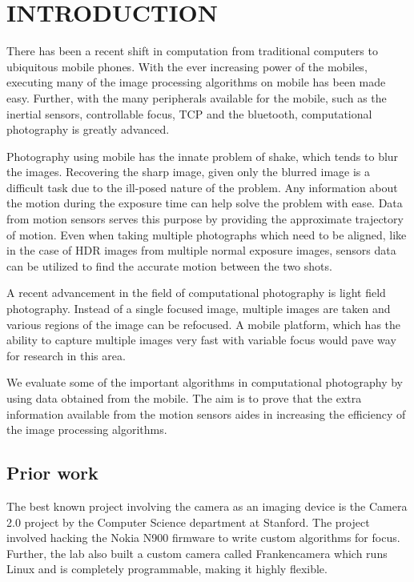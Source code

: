 \documentclass[BTech]{iitmdiss}
\begin{document}
\chapter{INTRODUCTION}
\label{chap:intro}
There has been a recent shift in computation from traditional computers
to ubiquitous mobile phones. With the ever increasing power of the mobiles, 
executing many of the image processing algorithms on mobile has been 
made easy. Further, with the many peripherals available for the mobile, such as
the inertial sensors, controllable focus, TCP and the bluetooth, 
computational photography is greatly advanced. 

Photography using mobile has the innate problem of shake, which tends to
blur the images. Recovering the sharp image, given only the blurred image
is a difficult task due to the ill-posed nature of the problem. Any
information about the motion during the exposure time can help solve
the problem with ease. Data from motion sensors serves this purpose by
providing the approximate trajectory of motion. Even when taking multiple
photographs which need to be aligned, like in the case of HDR images from
multiple normal exposure images, sensors data can be utilized to find
the accurate motion between the two shots. 

A recent advancement in the field of computational photography is light
field photography. Instead of a single focused image, multiple images
are taken and various regions of the image can be refocused. A mobile
platform, which has the ability to capture multiple images very fast
with variable focus would pave way for research in this area. 

We evaluate some of the important algorithms in computational
photography by using data obtained from the mobile. The aim is to prove
that the extra information available from the motion sensors aides in
increasing the efficiency of the image processing algorithms. 

\section{Prior work}
\label{intro:prior_work}
The best known project involving the camera as an imaging device is the 
Camera 2.0 project by the Computer Science department at Stanford. The
project involved hacking the Nokia N900 firmware to write custom algorithms
for focus. Further, the lab also built a custom camera called Frankencamera
which runs Linux and is completely programmable, making it highly flexible.
\end{document}
